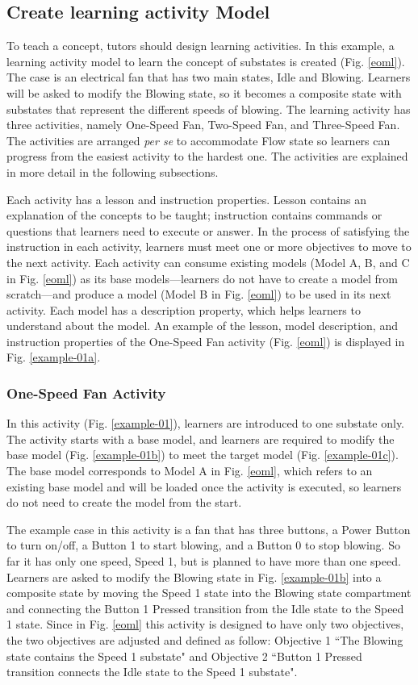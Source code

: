 \documentclass[conference]{IEEEtran}
\begin{document}
\subsection{Create learning activity Model}
To teach a concept, tutors should design learning activities. In this example, a learning activity model to learn the concept of substates is created (Fig. \ref{eoml}). The case is an electrical fan that has two main states, Idle and Blowing. Learners will be asked to modify the Blowing state, so it becomes a composite state with substates that represent the different speeds of blowing. The learning activity has three activities, namely One-Speed Fan, Two-Speed Fan, and Three-Speed Fan. The activities are arranged \textit{per se} to accommodate Flow state \cite{csikszentmihalyi2014toward} so learners can progress from the easiest activity to the hardest one. The activities are explained in more detail in the following subsections.
  
Each activity has a lesson and instruction properties. Lesson contains an explanation of the concepts to be taught; instruction contains commands or questions that learners need to execute or answer. In the process of satisfying the instruction in each activity, learners must meet one or more objectives to move to the next activity. Each activity can consume existing models (Model A, B, and C in Fig. \ref{eoml}) as its base models---learners do not have to create a model from scratch---and produce a model (Model B in Fig. \ref{eoml}) to be used in its next activity. Each model has a description property, which helps learners to understand about the model. An example of the lesson, model description, and instruction properties of the One-Speed Fan activity (Fig. \ref{eoml}) is displayed in Fig. \ref{example-01a}.    


\subsubsection{One-Speed Fan Activity}
In this activity (Fig. \ref{example-01}), learners are introduced to one substate only. The activity starts with a base model, and learners are required to modify the base model (Fig. \ref{example-01b}) to meet the target model (Fig. \ref{example-01c}). The base model corresponds to Model A in Fig. \ref{eoml}, which refers to an existing base model and will be loaded once the activity is executed, so learners do not need to create the model from the start. 

The example case in this activity is a fan that has three buttons, a Power Button to turn on/off, a Button 1 to start blowing, and a Button 0 to stop blowing. So far it has only one speed, Speed 1, but is planned to have more than one speed. Learners are asked to modify the Blowing state in Fig. \ref{example-01b} into a composite state by moving the Speed 1 state into the Blowing state compartment and connecting the Button 1 Pressed transition from the Idle state to the Speed 1 state. Since in Fig. \ref{eoml} this activity is designed to have only two objectives, the two objectives are adjusted and defined as follow: Objective 1 ``The Blowing state contains the Speed 1 substate" and Objective 2 ``Button 1 Pressed transition connects the Idle state to the Speed 1 substate".
\end{document}
